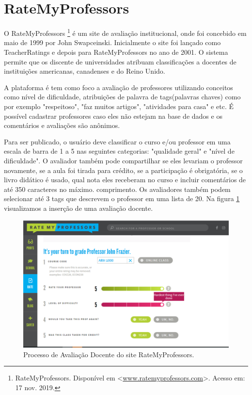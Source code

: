 \documentclass[12pt, a4paper]{report}
\begin{document}
\section{RateMyProfessors}
O RateMyProfessors \footnote{RateMyProfessors. Disponível em <\url{www.ratemyprofessors.com}>. Acesso em: 17 nov. 2019.} é um site de avaliação institucional, onde foi concebido em maio de 1999 por John Swapceinski. Inicialmente o site foi lançado como TeacherRatings e depois para RateMyProfessors no ano de 2001. O sistema permite que os discente de universidades atribuam classificações a docentes de instituições americanas, canadenses e do Reino Unido.

A plataforma é tem como foco a avaliação de professores utilizando conceitos como nível de dificuldade, atribuições de palavra de tags(palavras chaves) como por exemplo "respeitoso", "faz muitos artigos", "atividades para casa" e etc. É possível cadastrar professores caso eles não estejam na base de dados e os comentários e avaliações são anônimos.

Para ser publicado, o usuário deve classificar o curso e/ou professor em uma escala de barra de 1 a 5 nas seguintes categorias: "qualidade geral" e "nível de dificuldade". O avaliador também pode compartilhar se eles levariam o professor novamente, se a aula foi tirada para crédito, se a participação é obrigatória, se o livro didático é usado, qual nota eles receberam no curso e incluir comentários de até 350 caracteres no máximo. comprimento. Os avaliadores também podem selecionar até 3 tags que descrevem o professor em uma lista de 20. Na figura \ref{fig:ratemyprofessor} visualizamos a inserção de uma avaliação docente.

\begin{figure}
\centering
\includegraphics[scale=0.45]{ratemyprofessor.png}
\caption{Processo de Avaliação Docente do site RateMyProfessors.}
\label{fig:ratemyprofessor}
\end{figure}
\end{document}
